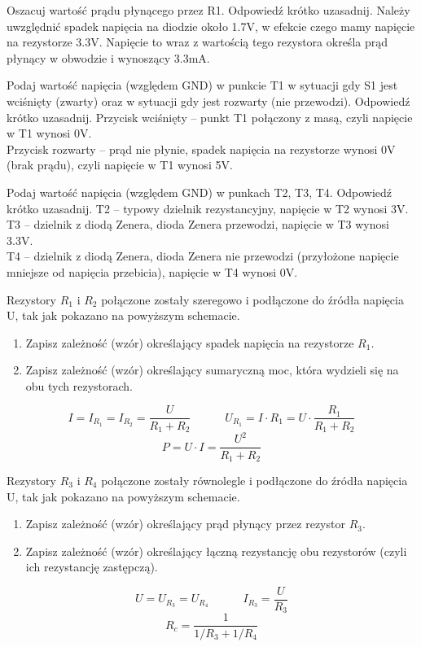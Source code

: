 %
%

\dbEntryCheckResults
Oszacuj wartość prądu płynącego przez R1. Odpowiedź krótko uzasadnij.
\fi
{}\dbEntryCheckResults
Należy uwzględnić spadek napięcia na diodzie około 1.7V, w efekcie czego mamy napięcie na rezystorze 3.3V.
Napięcie to wraz z wartością tego rezystora określa prąd płynący w obwodzie i wynoszący 3.3mA.
\fi

\dbEntryCheckResults
Podaj wartość napięcia (względem GND) w punkcie T1 w sytuacji gdy S1 jest wciśnięty (zwarty) oraz w sytuacji gdy jest rozwarty (nie przewodzi). Odpowiedź krótko uzasadnij.
\fi
{}\dbEntryCheckResults
Przycisk wciśnięty – punkt T1 połączony z masą, czyli napięcie w T1 wynosi 0V.\\
Przycisk rozwarty – prąd nie płynie, spadek napięcia na rezystorze wynosi 0V (brak prądu), czyli napięcie w T1 wynosi 5V.
\fi

\dbEntryCheckResults
Podaj wartość napięcia (względem GND) w punkach T2, T3, T4. Odpowiedź krótko uzasadnij.
\fi
{}\dbEntryCheckResults
T2 – typowy dzielnik rezystancyjny, napięcie w T2 wynosi 3V.\\
T3 – dzielnik z diodą Zenera, dioda Zenera przewodzi, napięcie w T3 wynosi 3.3V.\\
T4 – dzielnik z diodą Zenera, dioda Zenera nie przewodzi (przyłożone napięcie mniejsze od napięcia przebicia), napięcie w T4 wynosi 0V.
\fi

\dbEntryCheckResults
  Rezystory $R_1$ i $R_2$ połączone zostały szeregowo i podłączone do źródła napięcia U, tak jak pokazano na powyższym schemacie.
  \begin{enumerate}[label=\alph*)]
    \item Zapisz zależność (wzór) określający spadek napięcia na rezystorze $R_1$.
    \item Zapisz zależność (wzór) określający sumaryczną moc, która wydzieli się na obu tych rezystorach.
  \end{enumerate}
\fi
{}\dbEntryCheckResults
$$I = I_{R_1} = I_{R_2} = \frac{U}{R_1 + R_2}  \quad\qquad  U_{R_1} = I · R_1 = U · \frac{R_1}{R_1 + R_2}$$
$$P = U·I = \frac{U^2}{R_1 + R_2}$$
\fi

\dbEntryCheckResults
  Rezystory $R_3$ i $R_4$ połączone zostały równolegle i podłączone do źródła napięcia U, tak jak pokazano na powyższym schemacie.
  \begin{enumerate}[label=\alph*)]
    \item Zapisz zależność (wzór) określający prąd płynący przez rezystor $R_3$.
    \item Zapisz zależność (wzór) określający łączną rezystancję obu rezystorów (czyli ich rezystancję zastępczą).
  \end{enumerate}
\fi
{}\dbEntryCheckResults
$$U = U_{R_3} = U_{R_4}  \quad\qquad  I_{R_3} = \frac{U}{R_3}$$
$$R_c = \frac{1}{1/R_3 + 1/R_4}$$
\fi

